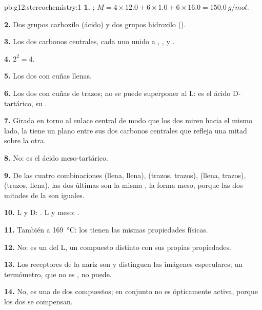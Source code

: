 \begin{solution}{pb:g12:stereochemistry:1}
\textbf{1.} ; $M = 4 \times 12.0 + 6 \times 1.0 + 6 \times 16.0
= \qty{150.0}{g/mol}$.

\textbf{2.} Dos grupos carboxilo (ácido) y dos grupos hidroxilo
().

\textbf{3.} Los dos carbonos centrales, cada uno unido a , ,
 y .

\textbf{4.} $2^2 = 4$.

\textbf{5.} Los dos con cuñas llenas.

\textbf{6.} Los dos  con cuñas de trazos; no se puede superponer
al L: es el ácido D-tartárico, su .

\textbf{7.} Girada en torno al enlace central de modo que los dos
 miren hacia el mismo lado, la  tiene un plano entre sus
dos carbonos centrales que refleja una mitad sobre la otra.

\textbf{8.} No: es el ácido meso-tartárico.

\textbf{9.} De las cuatro combinaciones (llena, llena), (trazos, trazos),
(llena, trazos), (trazos, llena), las dos últimas son la misma ,
la forma meso, porque las dos mitades de la  son iguales.

\textbf{10.} L y D: . L y meso: .

\textbf{11.} También a \qty{169}{\celsius}: los  tienen las
mismas propiedades físicas.

\textbf{12.} No: es un  del L, un compuesto distinto con
sus propias propiedades.

\textbf{13.} Los receptores de la nariz son  y distinguen las
imágenes especulares; un termómetro, que no es , no puede.

\textbf{14.} No, es una  de dos compuestos; en conjunto no es
ópticamente activa, porque los dos  se compensan.


\end{solution}
